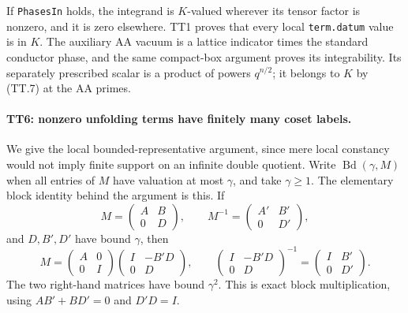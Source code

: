 If \texttt{PhasesIn} holds, the integrand is $K$-valued wherever
its tensor factor is nonzero, and it is zero elsewhere. TT1 proves
that every local \texttt{term.datum} value is in $K$. The auxiliary
AA vacuum is a lattice indicator times the standard conductor
phase, and the same compact-box argument proves its integrability.
Its separately prescribed scalar is a product of powers
$q^{n/2}$; it belongs to $K$ by (TT.7) at the AA primes.

\paragraph{TT6: nonzero unfolding terms have finitely many coset labels.}
We give the local bounded-representative argument, since mere local
constancy would not imply finite support on an infinite double
quotient. Write $\operatorname{Bd}(\gamma,M)$ when all entries of
$M$ have valuation at most $\gamma$, and take $\gamma\geq1$.
The elementary block identity behind the argument is this. If
\[
 M=\begin{pmatrix}A&B\\0&D\end{pmatrix},\qquad
 M^{-1}=\begin{pmatrix}A'&B'\\0&D'\end{pmatrix},
\]
and $D,B',D'$ have bound $\gamma$, then
\[
 M=\begin{pmatrix}A&0\\0&I\end{pmatrix}
       \begin{pmatrix}I&-B'D\\0&D\end{pmatrix},\qquad
 \begin{pmatrix}I&-B'D\\0&D\end{pmatrix}^{-1}
       =\begin{pmatrix}I&B'\\0&D'\end{pmatrix}.             \tag{TT.10}
\]
The two right-hand matrices have bound $\gamma^2$. This is exact
block multiplication, using $AB'+BD'=0$ and $D'D=I$.

